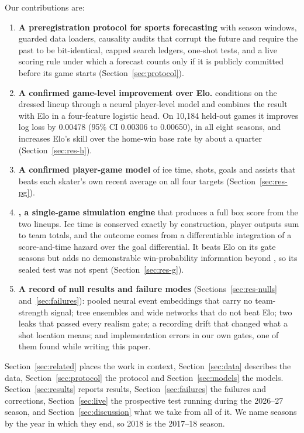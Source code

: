 Our contributions are:
\begin{enumerate}
  \item \textbf{A preregistration protocol for sports forecasting} with season
  windows, guarded data loaders, causality audits that corrupt the future and
  require the past to be bit-identical, capped search ledgers, one-shot tests,
  and a live scoring rule under which a forecast counts only if it is publicly
  committed before its game starts (Section~\ref{sec:protocol}).
  \item \textbf{A confirmed game-level improvement over Elo.} \neurhlH{} conditions
  on the dressed lineup through a neural player-level model and combines the
  result with Elo in a four-feature logistic head. On 10,184 held-out games it
  improves log loss by 0.00478 (95\% CI 0.00306 to 0.00650), in all eight
  seasons, and increases Elo's skill over the home-win base rate by about a
  quarter (Section~\ref{sec:res-h}).
  \item \textbf{A confirmed player-game model} of ice time, shots, goals and
  assists that beats each skater's own recent average on all four targets
  (Section~\ref{sec:res-pg}).
  \item \textbf{\neurhlG{}, a single-game simulation engine} that produces a full
  box score from the two lineups. Ice time is conserved exactly by
  construction, player outputs sum to team totals, and the outcome comes from a
  differentiable integration of a score-and-time hazard over the goal
  differential. It beats Elo on its gate seasons but adds no demonstrable
  win-probability information beyond \neurhlH{}, so its sealed test was not spent
  (Section~\ref{sec:res-g}).
  \item \textbf{A record of null results and failure modes}
  (Sections~\ref{sec:res-nulls} and~\ref{sec:failures}): pooled neural event
  embeddings that carry no team-strength signal; tree ensembles and wide
  networks that do not beat Elo; two leaks that passed every realism gate; a
  recording drift that changed what a shot location means; and implementation
  errors in our own gates, one of them found while writing this paper.
\end{enumerate}

Section~\ref{sec:related} places the work in context, Section~\ref{sec:data}
describes the data, Section~\ref{sec:protocol} the protocol and
Section~\ref{sec:models} the models. Section~\ref{sec:results} reports results,
Section~\ref{sec:failures} the failures and corrections,
Section~\ref{sec:live} the prospective test running during the 2026--27
season, and Section~\ref{sec:discussion} what we take from all of it. We name
seasons by the year in which they end, so 2018 is the 2017--18 season.
